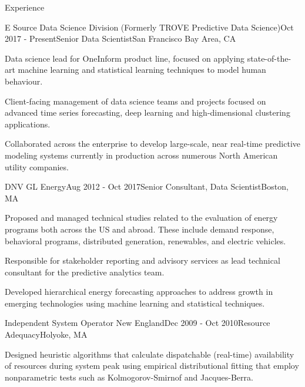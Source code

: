 \documentclass{resume} %
\begin{document}

\begin{rSection}{Experience}
\begin{rSubsection}{E Source Data Science Division (Formerly TROVE Predictive Data Science)}{Oct 2017 - Present}{Senior Data Scientist}{San Francisco Bay Area, CA}
\item Data science lead for OneInform product line, focused on applying state-of-the-art machine learning and statistical learning techniques to model human behaviour.
\item Client-facing management of data science teams and projects focused on advanced time series forecasting, deep learning and high-dimensional clustering applications.
\item Collaborated across the enterprise to develop large-scale, near real-time predictive modeling systems currently in production across numerous North American utility companies.
\end{rSubsection}


\begin{rSubsection}{DNV GL Energy}{Aug 2012 - Oct 2017}{Senior Consultant, Data Scientist}{Boston, MA}
\item Proposed and managed technical studies related to the evaluation of energy programs both across the US and abroad. These include demand response, behavioral programs, distributed generation, renewables, and electric vehicles.
\item Responsible for stakeholder reporting and advisory services as lead technical consultant for the  predictive analytics team.
\item Developed hierarchical energy forecasting approaches to address growth in emerging technologies using machine learning and statistical techniques.

\end{rSubsection}


\begin{rSubsection}{Independent System Operator New England}{Dec 2009 - Oct 2010}{Resource Adequacy}{Holyoke, MA}

\item Designed heuristic algorithms that calculate dispatchable (real-time) availability of resources during system peak using empirical distributional fitting that employ nonparametric tests such as Kolmogorov-Smirnof and Jacques-Berra.


\end{rSubsection}
\end{rSection}
\end{document}
